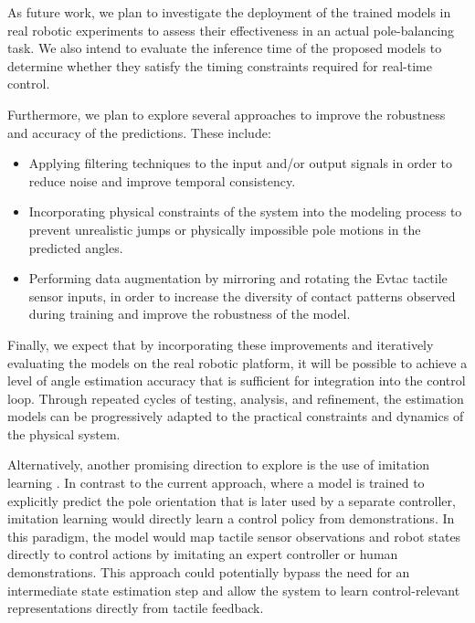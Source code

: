 \documentclass{article}
\begin{document}
As future work, we plan to investigate the deployment of the
trained models in real robotic experiments to assess their
effectiveness in an actual pole-balancing task. We also intend
to evaluate the inference time of the proposed models to
determine whether they satisfy the timing constraints required
for real-time control.

Furthermore, we plan to explore several approaches to improve the robustness and accuracy of the predictions. These include:

\begin{itemize}
    \item Applying filtering techniques to the input and/or output signals in order to reduce noise and improve temporal consistency.
    \item Incorporating physical constraints of the system into the modeling process to prevent unrealistic jumps or physically impossible pole motions in the predicted angles.
    \item Performing data augmentation by mirroring and rotating the Evtac tactile sensor inputs, in order to increase the diversity of contact patterns observed during training and improve the robustness of the model.
\end{itemize}

Finally, we expect that by incorporating these improvements and
iteratively evaluating the models on the real robotic platform,
it will be possible to achieve a level of angle estimation
accuracy that is sufficient for integration into the control
loop. Through repeated cycles of testing, analysis, and
refinement, the estimation models can be progressively adapted
to the practical constraints and dynamics of the physical system.

Alternatively, another promising direction to explore is the use
of imitation learning \cite{ho2016generative}. In contrast to the current approach,
where a model is trained to explicitly predict the pole
orientation that is later used by a separate controller,
imitation learning would directly learn a control policy from
demonstrations. In this paradigm, the model would map tactile
sensor observations and robot states directly to control actions
by imitating an expert controller or human demonstrations.
This approach could potentially bypass the need for an
intermediate state estimation step and allow the system to
learn control-relevant representations directly from tactile
feedback.



\end{document}

